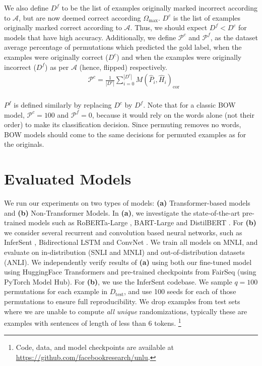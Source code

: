\documentclass[letterpaper, 12pt]{report}
\begin{document}
We also define %
$D^{f}$ to be the list of examples originally marked incorrect according to $\mathcal{A}$, but are now deemed correct according $\Omega_{\text{max}}$. $D^{c}$ is the list of examples originally marked correct according to  $\mathcal{A}$. Thus, we should expect $D^{f}<D^{c}$ for models that have high accuracy.
Additionally, we define $\mathcal{P}^c$ and $\mathcal{P}^f$, as the dataset average percentage of permutations which predicted the gold label, when the examples were originally correct ($D^{c}$) and when the examples were originally incorrect ($D^{f}$) as per $\mathcal{A}$ (hence, flipped) respectively.
\begin{equation}
\begin{split}
    &\mathcal{P}^{c} = \frac{1}{|D^{c}|} \sum_{i=0}^{|D^{c}|} M(\hat{P}_i, \hat{H}_i)_{\text{cor}}\\
\end{split}
\end{equation}

\noindent $P^f$ is defined similarly by replacing $D^c$ by $D^f$. Note that for a classic BOW model,  $\mathcal{P}^c=100$ and $\mathcal{P}^f=0$, because it would rely on the words alone (not their order) to make its classification decision. Since permuting removes no words, BOW models should come to the same decisions for permuted examples as for the originals.



\section{Evaluated Models}


We run our experiments on two types of models: \textbf{(a)} Transformer-based models and \textbf{(b)} Non-Transformer Models. In \textbf{(a)}, we investigate the state-of-the-art pre-trained models such as RoBERTa-Large \cite{liu-et-al-2019-roberta}, BART-Large \cite{lewis-etal-2020-bart} and DistilBERT \cite{sanh2020distilbert}. For \textbf{(b)} we consider several recurrent and convolution based neural networks, such as InferSent \cite{conneau-etal-2017-supervised}, Bidirectional LSTM \cite{collobert2008unified} and ConvNet \cite{zhao2015self}. We train all models on MNLI, and evaluate on in-distribution (SNLI and MNLI) and out-of-distribution datasets (ANLI). We independently verify results of \textbf{(a)} using both our fine-tuned model using HuggingFace Transformers \cite{wolf2020transformers} and pre-trained checkpoints from FairSeq \cite{ott2019fairseq} (using PyTorch Model Hub). For \textbf{(b)}, we use the InferSent codebase. We sample $q=100$ permutations for each example in $D_{\text{test}}$, and use 100 seeds for each of those permutations to ensure full reproducibility. We drop examples from test sets where we are unable to compute \textit{all unique} randomizations, typically these are examples with sentences of length of less than 6 tokens. \footnote{Code, data, and model checkpoints are available at \href{https://github.com/facebookresearch/unlu}{https://github.com/facebookresearch/unlu}.}
\end{document}
